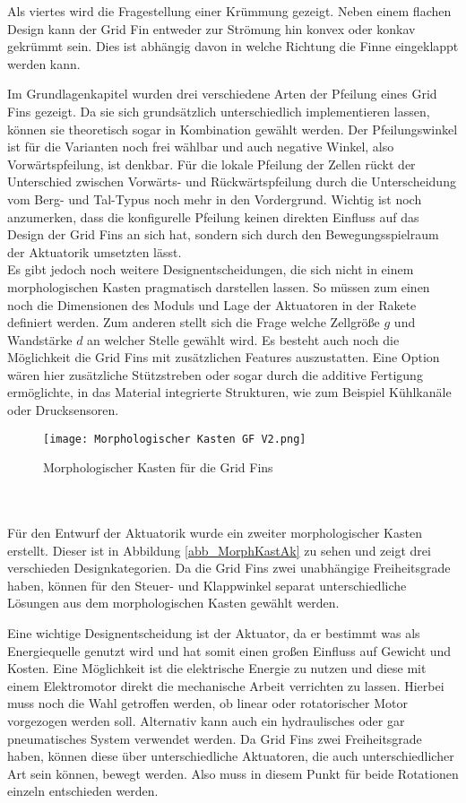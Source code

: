 Als viertes wird die Fragestellung einer Krümmung gezeigt. Neben einem flachen Design kann der Grid Fin entweder zur Strömung hin konvex oder konkav gekrümmt sein. Dies ist abhängig davon in welche Richtung die Finne eingeklappt werden kann.

Im Grundlagenkapitel wurden drei verschiedene Arten der Pfeilung eines Grid Fins gezeigt. Da sie sich grundsätzlich unterschiedlich implementieren lassen, können sie theoretisch sogar in Kombination gewählt werden. Der Pfeilungswinkel ist für die Varianten noch frei wählbar und auch negative Winkel, also Vorwärtspfeilung, ist denkbar. Für die lokale Pfeilung der Zellen rückt der Unterschied zwischen Vorwärts- und Rückwärtspfeilung durch die Unterscheidung vom Berg- und Tal-Typus noch mehr in den Vordergrund. Wichtig ist noch anzumerken, dass die konfigurelle Pfeilung keinen direkten Einfluss auf das Design der Grid Fins an sich hat, sondern sich durch den Bewegungsspielraum der Aktuatorik umsetzten lässt.\\
Es gibt jedoch noch weitere Designentscheidungen, die sich nicht in einem morphologischen Kasten pragmatisch darstellen lassen. So müssen zum einen noch die Dimensionen des Moduls und Lage der Aktuatoren in der Rakete definiert werden. Zum anderen stellt sich die Frage welche Zellgröße $g$ und Wandstärke $d$ an welcher Stelle gewählt wird. Es besteht auch noch die Möglichkeit die Grid Fins mit zusätzlichen Features auszustatten. Eine Option wären hier zusätzliche Stützstreben oder sogar durch die additive Fertigung ermöglichte, in das Material integrierte Strukturen, wie zum Beispiel Kühlkanäle oder Drucksensoren.
\begin{figure}[h]
	\centering
	\texttt{[image: Morphologischer Kasten GF V2.png]}
	\caption{Morphologischer Kasten für die Grid Fins}
	\label{abb_MorphKastGF}
\end{figure}\\~\\
Für den Entwurf der Aktuatorik wurde ein zweiter morphologischer Kasten erstellt. Dieser ist in Abbildung \ref{abb_MorphKastAk} zu sehen und zeigt drei verschieden Designkategorien. Da die Grid Fins zwei unabhängige Freiheitsgrade haben, können für den Steuer- und Klappwinkel separat unterschiedliche Lösungen aus dem morphologischen Kasten gewählt werden.

Eine wichtige Designentscheidung ist der Aktuator, da er bestimmt was als Energiequelle genutzt wird und hat somit einen großen Einfluss auf Gewicht und Kosten. Eine Möglichkeit ist die elektrische Energie zu nutzen und diese mit einem Elektromotor direkt die mechanische Arbeit verrichten zu lassen. Hierbei muss noch die Wahl getroffen werden, ob linear oder rotatorischer Motor vorgezogen werden soll. Alternativ kann auch ein hydraulisches oder gar pneumatisches System verwendet werden. Da Grid Fins zwei Freiheitsgrade haben, können diese über unterschiedliche Aktuatoren, die auch unterschiedlicher Art sein können, bewegt werden. Also muss in diesem Punkt für beide Rotationen einzeln entschieden werden.

